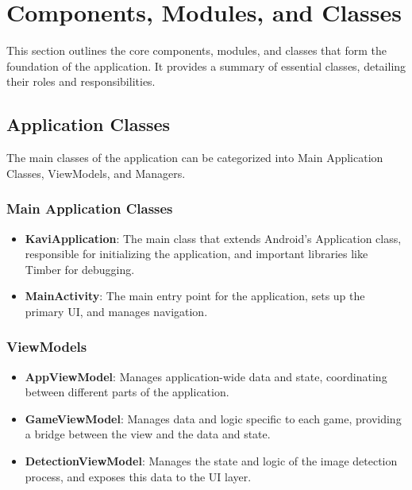 \section{Components, Modules, and Classes}

This section outlines the core components, modules, and classes that form the foundation of the application. It provides a summary of essential classes, detailing their roles and responsibilities.

\subsection{Application Classes}
The main classes of the application can be categorized into Main Application Classes, ViewModels, and Managers.
\subsubsection{Main Application Classes}
\begin{itemize}
    \item \textbf{KaviApplication}: The main class that extends Android's Application class, responsible for initializing the application, and important libraries like Timber for debugging.
    \item \textbf{MainActivity}: The main entry point for the application, sets up the primary UI, and manages navigation.
\end{itemize}

\subsubsection{ViewModels}
\begin{itemize}
  \item \textbf{AppViewModel}: Manages application-wide data and state, coordinating between different parts of the application.
    \item \textbf{GameViewModel}: Manages data and logic specific to each game, providing a bridge between the view and the data and state.
      \item \textbf{DetectionViewModel}: Manages the state and logic of the image detection process, and exposes this data to the UI layer.
\end{itemize}

